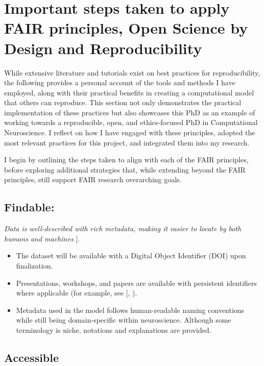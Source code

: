\documentclass[
  11pt,
  letterpaper,
]{scrreprt}
\providecommand{\tightlist}{%
  \setlength{\itemsep}{0pt}\setlength{\parskip}{0pt}}\usepackage{longtable,booktabs,array}
\begin{document}
\section{Important steps taken to apply FAIR principles, Open Science by
Design and
Reproducibility}\label{important-steps-taken-to-apply-fair-principles-open-science-by-design-and-reproducibility}

While extensive literature and tutorials exist on best practices for
reproducibility, the following provides a personal account of the tools
and methods I have employed, along with their practical benefits in
creating a computational model that others can reproduce. This section
not only demonstrates the practical implementation of these practices
but also showcases this PhD as an example of working towards a
reproducible, open, and ethics-focused PhD in Computational
Neuroscience. I reflect on how I have engaged with these principles,
adopted the most relevant practices for this project, and integrated
them into my research.

I begin by outlining the steps taken to align with each of the FAIR
principles, before exploring additional strategies that, while extending
beyond the FAIR principles, still support FAIR research overarching
goals.

\subsection{Findable:}\label{findable}

\emph{Data is well-described with rich metadata, making it easier to
locate by both humans and machines}
{[}\citeproc{ref-jacobsen2020FAIR}{377}{]}.

\begin{itemize}
\tightlist
\item
  The dataset will be available with a Digital Object Identifier (DOI)
  upon finalization.
\item
  Presentations, workshops, and papers are available with persistent
  identifiers where applicable (for example, see
  {[},
  \citeproc{ref-romangarcia2023Data}{379}{]}).
\item
  Metadata used in the model follows human-readable naming conventions
  while still being domain-specific within neuroscience. Although some
  terminology is niche, notations and explanations are provided.
\end{itemize}

\subsection{Accessible}\label{accessible}
\end{document}
